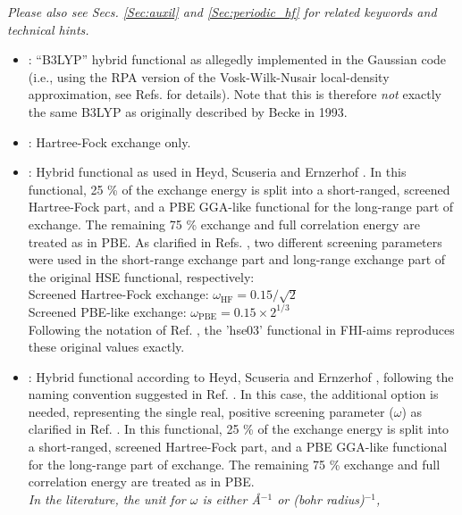 \begin{itemize}
     \emph{Please also see Secs. \ref{Sec:auxil} and \ref{Sec:periodic_hf} for related keywords and technical hints.}
    \begin{itemize}
      \item {} : ``B3LYP'' hybrid functional as allegedly
        implemented in the Gaussian code (i.e., using the RPA version of the
        Vosk-Wilk-Nusair local-density approximation, see Refs. \cite{Vosko80,Scuseria05}
        for details). Note that this is therefore \emph{not} exactly
        the same B3LYP as originally described by Becke in 1993. 
      \item {} : Hartree-Fock exchange only.
      \item {} : Hybrid functional as used in Heyd, Scuseria and
        Ernzerhof \cite{Heyd03,Heyd06}. In this functional, 25 \% of the exchange energy is
        split into a short-ranged, screened Hartree-Fock part, and a PBE
        GGA-like functional for the long-range part of exchange. The remaining
        75 \% exchange and full correlation energy are treated as in PBE. As
        clarified in Refs. \cite{Krukau06,Heyd06}, two different screening parameters
        were used in the short-range exchange part and long-range exchange
        part of the original HSE functional, respectively: \\
        Screened Hartree-Fock exchange: $\omega_\text{HF}=0.15/\sqrt{2}$ \\
        Screened PBE-like exchange: $\omega_\text{PBE}=0.15\times 2^{1/3}$ \\
        Following the notation of Ref. \cite{Krukau06}, the 'hse03' functional 
        in FHI-aims reproduces these original values exactly.
      \item {} : Hybrid functional according to
        Heyd, Scuseria and Ernzerhof \cite{Heyd03}, following the naming convention
        suggested in Ref. \cite{Krukau06}. In this case, the
        additional option  is needed, representing the single
        real, positive screening parameter  ($\omega$) as clarified
        in Ref. \cite{Krukau06}. In this functional, 25 \% of the
        exchange energy is split into a short-ranged, screened
        Hartree-Fock part, and a PBE GGA-like functional for the
        long-range part of exchange. The remaining
        75 \% exchange and full correlation energy are treated as in PBE. \\
        \emph{In the literature, the unit for $\omega$ is either {\AA}$^{-1}$ or (bohr radius)$^{-1}$, 
}
\end{itemize}
\end{itemize}
